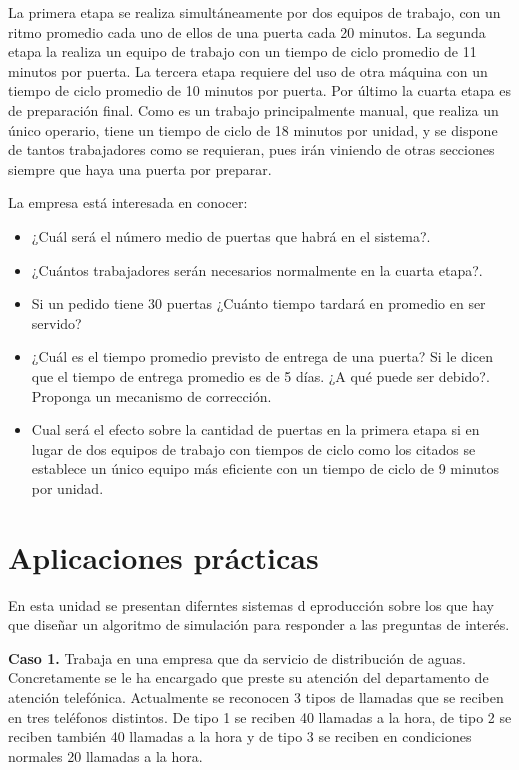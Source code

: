 \documentclass[
]{book}
\providecommand{\tightlist}{%
  \setlength{\itemsep}{0pt}\setlength{\parskip}{0pt}}
\theoremstyle{definition}
\theoremstyle{definition}
\theoremstyle{definition}
\theoremstyle{definition}
\theoremstyle{remark}
\begin{document}
La primera etapa se realiza simultáneamente por dos equipos de trabajo, con un ritmo promedio cada uno de ellos de una puerta cada 20 minutos. La segunda etapa la realiza un equipo de trabajo con un tiempo de ciclo promedio de 11 minutos por puerta. La tercera etapa requiere del uso de otra máquina con un tiempo de ciclo promedio de 10 minutos por puerta. Por último la cuarta etapa es de preparación final. Como es un trabajo principalmente manual, que realiza un único operario, tiene un tiempo de ciclo de 18 minutos por unidad, y se dispone de tantos trabajadores como se requieran, pues irán viniendo de otras secciones siempre que haya una puerta por preparar.

La empresa está interesada en conocer:

\begin{itemize}
\tightlist
\item
  ¿Cuál será el número medio de puertas que habrá en el sistema?.
\item
  ¿Cuántos trabajadores serán necesarios normalmente en la cuarta etapa?.
\item
  Si un pedido tiene 30 puertas ¿Cuánto tiempo tardará en promedio en ser servido?
\item
  ¿Cuál es el tiempo promedio previsto de entrega de una puerta? Si le dicen que el tiempo de entrega promedio es de 5 días. ¿A qué puede ser debido?. Proponga un mecanismo de corrección.
\item
  Cual será el efecto sobre la cantidad de puertas en la primera etapa si en lugar de dos equipos de trabajo con tiempos de ciclo como los citados se establece un único equipo más eficiente con un tiempo de ciclo de 9 minutos por unidad.
\end{itemize}

\hypertarget{SIMSIST}{%
\chapter{Aplicaciones prácticas}\label{SIMSIST}}

En esta unidad se presentan diferntes sistemas d eproducción sobre los que hay que diseñar un algoritmo de simulación para responder a las preguntas de interés.

\textbf{Caso 1.} Trabaja en una empresa que da servicio de distribución de aguas. Concretamente se le ha encargado que preste su atención del departamento de atención telefónica. Actualmente se reconocen 3 tipos de llamadas que se reciben en tres teléfonos distintos. De tipo 1 se reciben 40 llamadas a la hora, de tipo 2 se reciben también 40 llamadas a la hora y de tipo 3 se reciben en condiciones normales 20 llamadas a la hora.
\end{document}
